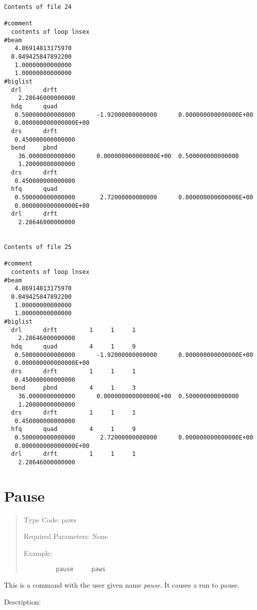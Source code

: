 \begin{footnotesize}
\begin{verbatim}
Contents of file 24

#comment
  contents of loop lnsex
#beam
   4.86914813175970
  0.849425847892200
   1.00000000000000
   1.00000000000000
#biglist
  drl      drft
    2.28646000000000
  hdq      quad
   0.500000000000000      -1.92000000000000      0.000000000000000E+00
   0.000000000000000E+00
  drs      drft
   0.450000000000000
  bend     pbnd
    36.0000000000000      0.000000000000000E+00  0.500000000000000
    1.20000000000000
  drs      drft
   0.450000000000000
  hfq      quad
   0.500000000000000       2.72000000000000      0.000000000000000E+00
   0.000000000000000E+00
  drl      drft
    2.28646000000000


Contents of file 25

#comment
  contents of loop lnsex
#beam
   4.86914813175970
  0.849425847892200
   1.00000000000000
   1.00000000000000
#biglist
  drl      drft         1     1     1
    2.28646000000000
  hdq      quad         4     1     9
   0.500000000000000      -1.92000000000000      0.000000000000000E+00
   0.000000000000000E+00
  drs      drft         1     1     1
   0.450000000000000
  bend     pbnd         4     1     3
    36.0000000000000      0.000000000000000E+00  0.500000000000000
    1.20000000000000
  drs      drft         1     1     1
   0.450000000000000
  hfq      quad         4     1     9
   0.500000000000000       2.72000000000000      0.000000000000000E+00
   0.000000000000000E+00
  drl      drft         1     1     1
    2.28646000000000

\end{verbatim}
\end{footnotesize}

\newpage
\section{Pause}
\begin{quotation}
\noindent Type Code:  paws
\vspace{5mm}

\noindent Required Parameters:  None

\vspace{5mm}
\noindent Example:
\begin{verbatim}
         pause     paws
\end{verbatim}
\end{quotation}
This is a command with the user given name {\em pause}.  It causes
a \Mary run to pause.

\vspace{5mm}
     Description:
\vspace{2mm}

